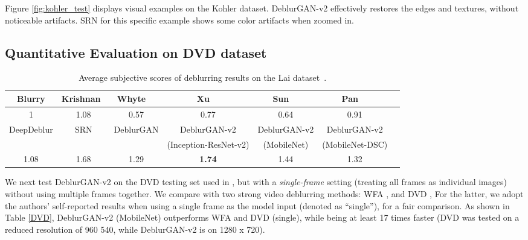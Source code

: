 \documentclass[10pt,twocolumn,letterpaper]{article}
\begin{document}
Figure \ref{fig:kohler_test} displays visual examples on the Kohler dataset. DeblurGAN-v2 effectively restores the edges and textures, without noticeable artifacts. SRN for this specific example shows some color artifacts when zoomed in. 








\subsection{Quantitative Evaluation on DVD dataset}
\vspace{-0.5em}

\begin{table*}[htbp] \scriptsize
\vspace{-1em}
	\caption{Average subjective scores of deblurring results on the Lai dataset~\cite{lai2016comparative}.}
    \vspace{-1.5em}
	\begin{center}\small{
			\begin{tabular}{|c|c|c|c|c|c|c}
				\hline
			   Blurry & Krishnan~\etal \cite{normalized_sparsity} & Whyte~\etal~\cite{whyte} & Xu~\etal ~\cite{XuUnnaturalDeblurring}  & Sun~\etal~\cite{SunLearningRemoval}&  Pan~\etal~\cite{darkchannelprior} \\
			   \hline
			   1 & 1.08 & 0.57 & 0.77 & 0.64 & 0.91 \\
			   \hline
			   \hline
			   DeepDeblur \cite{Nah2016DeepDeblurring}  & SRN \cite{tao2018scale}  &  DeblurGAN \cite{kupyn2018deblurgan}  & DeblurGAN-v2  & DeblurGAN-v2 &  DeblurGAN-v2  \\
			   	 & &    & (Inception-ResNet-v2)  &  (MobileNet) &  (MobileNet-DSC) \\
			   \hline
			   1.08 & 1.68 & 1.29 & \textbf{1.74} & 1.44 & 1.32 \\
\hline
		\end{tabular}}
		\label{tab-subjective}
	\end{center}
	\vspace{-1em}
\end{table*}


We next test DeblurGAN-v2 on the DVD testing set used in \cite{su2017deep}, but with a \textit{single-frame} setting (treating all frames as individual images) without using multiple frames together. We compare with two strong video deblurring methods: WFA \cite{delbracio2015burst}, and DVD \cite{su2017deep}, 
For the latter, we adopt the authors' self-reported results when using a single frame as the model input (denoted as ``single''), for a fair comparison. As shown in Table \ref{DVD}, DeblurGAN-v2 (MobileNet) outperforms WFA and DVD (single), while being at least 17 times faster (DVD was tested on a reduced resolution of 960  540, while DeblurGAN-v2 is on 1280 x 720). 
\end{document}
